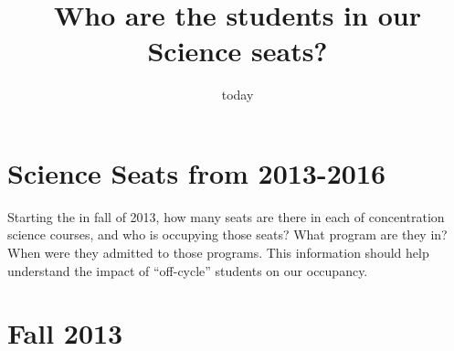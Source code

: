 \documentclass{article}\usepackage[]{graphicx}\usepackage[]{color}
\begin{document}
\title{Who are the students in our Science seats?}
\date{today}
\maketitle

\tableofcontents





\section{Science Seats from 2013-2016}

Starting the in fall of 2013, how many seats are there in each of concentration science courses, and who is occupying those seats? What program are they in? When were they admitted to those programs. This information should help understand the impact of ``off-cycle'' students on our occupancy.

\section{Fall 2013}
\end{document}
